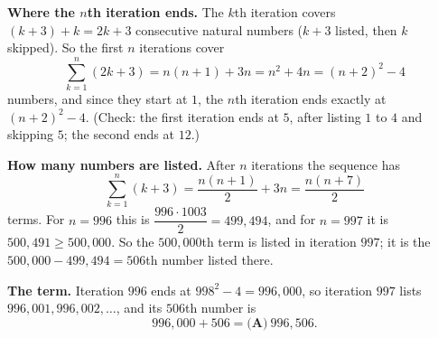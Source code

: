 \textbf{Where the $n$th iteration ends.} The $k$th iteration covers $(k+3)+k=2k+3$ consecutive natural numbers ($k+3$ listed, then $k$ skipped). So the first $n$ iterations cover
\[
\sum_{k=1}^{n}(2k+3)=n(n+1)+3n=n^2+4n=(n+2)^2-4
\]
numbers, and since they start at $1$, the $n$th iteration ends exactly at $(n+2)^2-4$. (Check: the first iteration ends at $5$, after listing $1$ to $4$ and skipping $5$; the second ends at $12$.)

\textbf{How many numbers are listed.} After $n$ iterations the sequence has
\[
\sum_{k=1}^{n}(k+3)=\dfrac{n(n+1)}{2}+3n=\dfrac{n(n+7)}{2}
\]
terms. For $n=996$ this is $\dfrac{996\cdot1003}{2}=499{,}494$, and for $n=997$ it is $500{,}491\ge500{,}000$. So the $500{,}000$th term is listed in iteration $997$; it is the $500{,}000-499{,}494=506$th number listed there.

\textbf{The term.} Iteration $996$ ends at $998^2-4=996{,}000$, so iteration $997$ lists $996{,}001,996{,}002,\dots$, and its $506$th number is
\[
996{,}000+506=\boxed{\textbf{(A)}\ 996{,}506}.
\]
